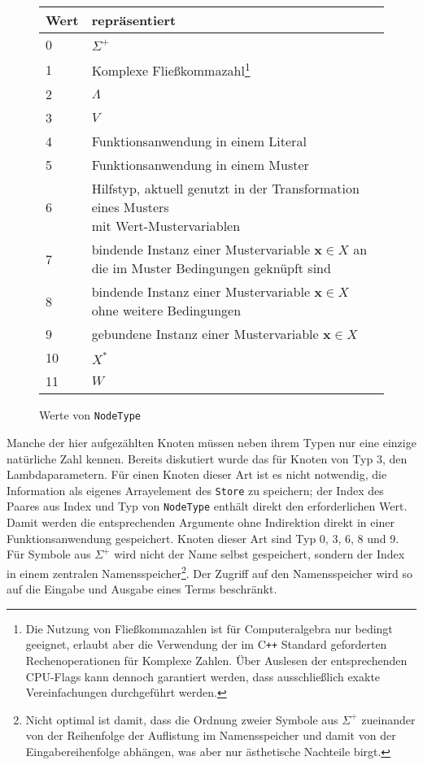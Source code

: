 \begin{figure}
    \centering
    \begin{tabular}{l l}
        \hline
        Wert & repräsentiert\\
        \hline \hline
        0 & $\Sigma^+$\\
        \hline
        1 & Komplexe Fließkommazahl\footnote{Die Nutzung von Fließkommazahlen ist für Computeralgebra nur bedingt geeignet, erlaubt aber die Verwendung der im C\texttt{++} Standard geforderten Rechenoperationen für Komplexe Zahlen. Über Auslesen der entsprechenden CPU-Flags kann dennoch garantiert werden, dass ausschließlich exakte Vereinfachungen durchgeführt werden.}\\
        \hline
        2 & $\Lambda$\\
        \hline
        3 & $V$\\
        \hline
        4 & Funktionsanwendung in einem Literal\\
        \hline
        5 & Funktionsanwendung in einem Muster\\
        \hline
        6 & \shortstack[l]{Hilfstyp, aktuell genutzt in der Transformation eines Musters \\ mit Wert-Mustervariablen}\\
        \hline
        7 & \shortstack[l]{bindende Instanz einer Mustervariable $\mathbf x \in X$ an die im Muster \\ Bedingungen geknüpft sind}\\
        \hline
        8 & bindende Instanz einer Mustervariable $\mathbf x \in X$ ohne weitere Bedingungen\\
        \hline
        9 & gebundene Instanz einer Mustervariable $\mathbf x \in X$\\
        \hline
        10 & $X^*$\\
        \hline
        11 & $W$\\
        \hline
    \end{tabular}
    \caption{Werte von \texttt{NodeType}}
    \label{tabNodeType}
\end{figure}

Manche der hier aufgezählten Knoten müssen neben ihrem Typen nur eine einzige natürliche Zahl kennen. Bereits diskutiert wurde das für Knoten von Typ $3$, den Lambdaparametern. Für einen Knoten dieser Art ist es nicht notwendig, die Information als eigenes Arrayelement des \verb|Store| zu speichern; der Index des Paares aus Index und Typ von \verb|NodeType| enthält direkt den erforderlichen Wert. Damit werden die entsprechenden Argumente ohne Indirektion direkt in einer Funktionsanwendung gespeichert. Knoten dieser Art sind Typ 0, 3, 6, 8 und 9. Für Symbole aus $\Sigma^+$ wird nicht der Name selbst gespeichert, sondern der Index in einem zentralen Namensspeicher\footnote{Nicht optimal ist damit, dass die Ordnung zweier Symbole aus $\Sigma^+$ zueinander von der Reihenfolge der Auflistung im Namensspeicher und damit von der Eingabereihenfolge abhängen, was aber nur ästhetische Nachteile birgt.}. Der Zugriff auf den Namensspeicher wird so auf die Eingabe und Ausgabe eines Terms beschränkt.


